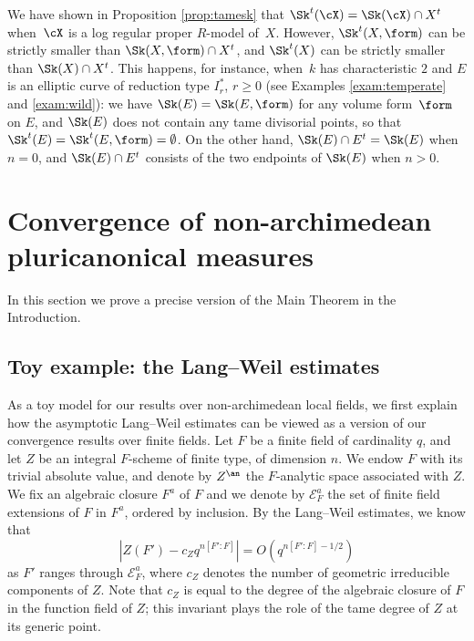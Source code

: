\begin{remark}
We have shown in Proposition \ref{prop:tamesk} that $\Sk^t(\cX)=\Sk(\cX)\cap X^t$ when~$\cX$ is a log regular proper $R$\nobreakdash-model of~$X$. However, $\Sk^t(X,\form)$ can be strictly smaller than $\Sk(X,\form)\cap X^t$, and $\Sk^t(X)$ can be strictly smaller than $\Sk(X)\cap X^t$.
This happens, for instance, when~$k$ has characteristic $2$ and $E$ is an elliptic curve of reduction type $I_r^{\ast}$, $r\geq 0$ (see Examples \ref{exam:temperate} and \ref{exam:wild}): we have $\Sk(E)=\Sk(E,\form)$ for any volume form~$\form$ on $E$, and $\Sk(E)$ does not contain any tame divisorial points, so that $\Sk^t(E)=\Sk^t(E,\form)=\emptyset$. On the other hand, $\Sk(E)\cap E^t=\Sk(E)$ when $n=0$, and $\Sk(E)\cap E^t$ consists of the two endpoints of $\Sk(E)$ when $n>0$.
\end{remark}

\pagebreak[2]
\section{Convergence of non-archimedean pluricanonical measures}\label{sec:padic}
In this section we prove a precise version of the Main Theorem in the Introduction.

\subsection{Toy example: the Lang--Weil estimates}\label{sec:langweil}
As a toy model for our results over non-archimedean local fields, we first explain how the asymptotic Lang--Weil estimates can be viewed as a version of our convergence results over finite fields. Let $F$ be a finite field of cardinality $q$, and let $Z$ be an integral $F$-scheme of finite type, of dimension $n$. We endow $F$ with its trivial absolute value, and denote by $Z^{\an}$ the $F$-analytic space associated with $Z$.
We fix an algebraic closure $F^a$ of $F$ and we denote by $\mathcal{E}^a_F$ the set of finite field extensions of $F$ in $F^a$, ordered by inclusion. By the Lang--Weil estimates, we know that
\[
|Z(F')-c_Zq^{n[F'\colon F]}|= O(q^{n[F'\colon F]-1/2})
\]
as $F'$ ranges through $\mathcal{E}^a_F$, where $c_Z$ denotes the number of geometric irreducible components of $Z$. Note that $c_Z$ is equal to the degree of the algebraic closure of $F$ in the function field of $Z$; this invariant plays the role of the tame degree of $Z$ at its generic point.

